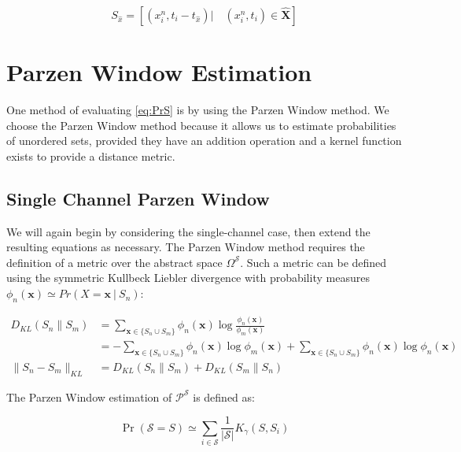 \documentclass[10pt]{article}
\begin{document}
\begin{equation} \label{eq:SyMultiple} 
S_{\hat{x}} =  \left[ \left( x_i^n,t_i - t_{\hat{x}} \right) | \quad (x_i^n,t_i) \in \mathbf{\hat{X}} \right] 
\end{equation}


\section{ Parzen Window Estimation}

One method of evaluating \ref{eq:PrS} is by using the Parzen Window method.  We choose the Parzen Window method because it allows us to estimate probabilities of unordered sets, provided they have an addition operation and a kernel function exists to provide a distance metric.  

\subsection{ Single Channel Parzen Window}

We will again begin by considering the single-channel case, then extend the resulting equations as necessary.  The Parzen Window method requires the definition of a metric over the abstract space \( \Omega^\mathcal{S} \).  Such a metric can be defined using the symmetric Kullbeck Liebler divergence with probability measures \( \phi_n(\mathbf{x}) \simeq Pr(X = \mathbf{x} \ | \ S_n) \):

\begin{align} \label{eq:KLsingle}
D_{KL}(S_n\|S_m) &= \sum_{\mathbf{x} \in \{ S_n \cup S_m \} } \phi_n( \mathbf{x} ) \log \frac{ \phi_n(\mathbf{x}) }{ \phi_m( \mathbf{x} ) } \nonumber \\
&= -\sum_{\mathbf{x} \in \{ S_n \cup S_m \} } \phi_n(\mathbf{x}) \log \phi_m(\mathbf{x}) + \sum_{\mathbf{x} \in \{ S_n \cup S_m \} } \phi_n(\mathbf{x}) \log \phi_n(\mathbf{x}) \\
\|S_n - S_m\|_{KL} &= D_{KL}(S_n\|S_m) + D_{KL}(S_m\|S_n)
\end{align}

The Parzen Window estimation of \( \mathcal{P}^\mathcal{S} \) is defined as:

\begin{equation} \label{eq:PrSParzenSingle}
\Pr( \mathcal{S} = S ) \simeq \sum_{i \in \mathcal{S}}  \frac{1}{|\mathcal{S}| } K_\gamma( S, S_i ) 
\end{equation}
\end{document}
